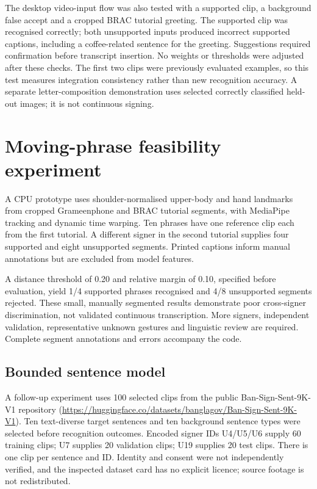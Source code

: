 \documentclass[11pt,a4paper]{article}
\begin{document}
The desktop video-input flow was also tested with a supported clip, a background false accept and a cropped BRAC tutorial greeting. The supported clip was recognised correctly; both unsupported inputs produced incorrect supported captions, including a coffee-related sentence for the greeting. Suggestions required confirmation before transcript insertion. No weights or thresholds were adjusted after these checks. The first two clips were previously evaluated examples, so this test measures integration consistency rather than new recognition accuracy. A separate letter-composition demonstration uses selected correctly classified held-out images; it is not continuous signing.

\section{Moving-phrase feasibility experiment}
A CPU prototype uses shoulder-normalised upper-body and hand landmarks from cropped Grameenphone and BRAC tutorial segments, with MediaPipe~\cite{hands} tracking and dynamic time warping. Ten phrases have one reference clip each from the first tutorial. A different signer in the second tutorial supplies four supported and eight unsupported segments. Printed captions inform manual annotations but are excluded from model features.

A distance threshold of 0.20 and relative margin of 0.10, specified before evaluation, yield 1/4 supported phrases recognised and 4/8 unsupported segments rejected. These small, manually segmented results demonstrate poor cross-signer discrimination, not validated continuous transcription. More signers, independent validation, representative unknown gestures and linguistic review are required. Complete segment annotations and errors accompany the code.

\subsection{Bounded sentence model}
A follow-up experiment uses 100 selected clips from the public Ban-Sign-Sent-9K-V1 repository (\url{https://huggingface.co/datasets/banglagov/Ban-Sign-Sent-9K-V1}). Ten text-diverse target sentences and ten background sentence types were selected before recognition outcomes. Encoded signer IDs U4/U5/U6 supply 60 training clips; U7 supplies 20 validation clips; U19 supplies 20 test clips. There is one clip per sentence and ID. Identity and consent were not independently verified, and the inspected dataset card has no explicit licence; source footage is not redistributed.
\end{document}
